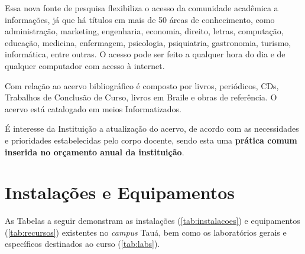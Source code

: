 \documentclass[
	12pt,				%
	openright,			%
	twoside,			%
	a4paper,			%
	chapter=TITLE,		%
	english,			%
	french,				%
	spanish,			%
	brazil,				%
	]{abntex2}
\begin{document}
Essa nova fonte de pesquisa flexibiliza o acesso da comunidade acadêmica a informações, já que há títulos em mais de 50 áreas de conhecimento, como administração, marketing, engenharia, economia, direito, letras, computação, educação, medicina, enfermagem, psicologia, psiquiatria, gastronomia, turismo, informática,  entre outras. O acesso pode ser feito a qualquer hora do dia e de qualquer computador com acesso à internet.

Com relação ao acervo bibliográfico é composto por livros, periódicos, CDs, Trabalhos de Conclusão de Curso, livros em Braile e  obras de referência. O acervo está catalogado em meios Informatizados.

É interesse da Instituição a atualização do acervo, de acordo com as necessidades e prioridades estabelecidas pelo corpo docente, sendo esta uma \textbf{prática comum inserida no orçamento anual da instituição}.


\section{Instalações e Equipamentos}

As Tabelas a seguir demonstram as instalações (\autoref{tab:instalacoes}) e equipamentos (\autoref{tab:recursos}) existentes no \textit{campus} Tauá, bem como os laboratórios gerais  e específicos destinados ao curso (\autoref{tab:labs}).  

\renewcommand{\arraystretch}{1.1}
\end{document}

